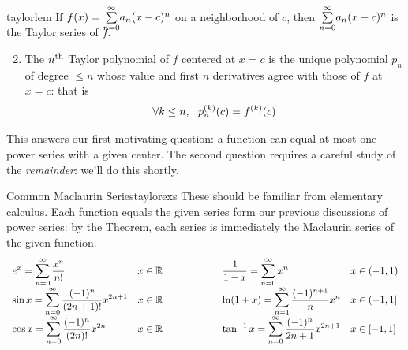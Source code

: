 \begin{thm}{}{taylorlem}
	\exstart If $f(x)=\smash[b]{\sum\limits_{n=0}^\infty} a_n(x-c)^n$ on a neighborhood of $c$, then $\smash[b]{\sum\limits_{n=0}^\infty} a_n(x-c)^n$ is the Taylor series of $f$.
	\begin{enumerate}\setcounter{enumi}{1}
		\item The $n\textsuperscript{th}$ Taylor polynomial of $f$ centered at $x=c$ is the unique polynomial $p_n$ of degree $\le n$ whose value and first $n$ derivatives agree with those of $f$ at $x=c$: that is
		\[
			\forall k\le n,\ \ \smash[t]{p_n^{(k)}(c)=f^{(k)}(c)}
		\]
	\end{enumerate}
\end{thm}

This answers our first motivating question: a function can equal at most one power series with a given center. The second question requires a careful study of the \emph{remainder}: we'll do this shortly.

\begin{examples}{Common Maclaurin Series}{taylorexs}
	These should be familiar from elementary calculus. Each function equals the given series form our previous discussions of power series: by the Theorem, each series is immediately the Maclaurin series of the given function.
	\[
		\def\arraystretch{2}
		\begin{array}{ll@{\qquad\qquad\qquad}ll}
			\displaystyle e^x=\sum_{n=0}^\infty\frac{x^n}{n!} & x\in\R
			&\displaystyle\frac 1{1-x}=\sum_{n=0}^\infty x^n & x\in(-1,1)\\
			\displaystyle\sin x=\sum_{n=0}^\infty\frac{(-1)^n}{(2n+1)!}x^{2n+1} & x\in\R
			&\displaystyle\ln(1+x)=\sum_{n=1}^\infty \frac{(-1)^{n+1}}nx^n & x\in (-1,1]\\
			\displaystyle\cos x=\sum_{n=0}^\infty\frac{(-1)^n}{(2n)!}x^{2n} & x\in\R
			&\displaystyle\tan^{-1}x=\sum_{n=0}^\infty \frac{(-1)^n}{2n+1}x^{2n+1} & x\in[-1,1]
		\end{array}
	\]
\end{examples}


\goodbreak


